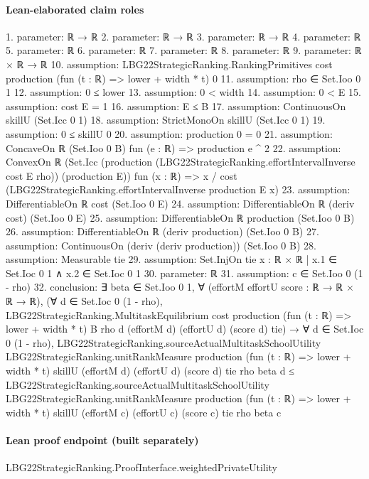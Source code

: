 \documentclass[10pt]{article}
\begin{document}
\paragraph{Lean-elaborated claim roles}\begin{ReviewVerbatim}
1. parameter: ℝ → ℝ
2. parameter: ℝ → ℝ
3. parameter: ℝ → ℝ
4. parameter: ℝ
5. parameter: ℝ
6. parameter: ℝ
7. parameter: ℝ
8. parameter: ℝ
9. parameter: ℝ × ℝ → ℝ
10. assumption: LBG22StrategicRanking.RankingPrimitives cost production (fun (t : ℝ) => lower + width * t) 0
11. assumption: rho ∈ Set.Ioo 0 1
12. assumption: 0 ≤ lower
13. assumption: 0 < width
14. assumption: 0 < E
15. assumption: cost E = 1
16. assumption: E ≤ B
17. assumption: ContinuousOn skillU (Set.Icc 0 1)
18. assumption: StrictMonoOn skillU (Set.Icc 0 1)
19. assumption: 0 ≤ skillU 0
20. assumption: production 0 = 0
21. assumption: ConcaveOn ℝ (Set.Ioo 0 B) fun (e : ℝ) => production e ^ 2
22. assumption: ConvexOn ℝ (Set.Icc (production (LBG22StrategicRanking.effortIntervalInverse cost E rho)) (production E)) fun (x : ℝ) =>
  x / cost (LBG22StrategicRanking.effortIntervalInverse production E x)
23. assumption: DifferentiableOn ℝ cost (Set.Ioo 0 E)
24. assumption: DifferentiableOn ℝ (deriv cost) (Set.Ioo 0 E)
25. assumption: DifferentiableOn ℝ production (Set.Ioo 0 B)
26. assumption: DifferentiableOn ℝ (deriv production) (Set.Ioo 0 B)
27. assumption: ContinuousOn (deriv (deriv production)) (Set.Ioo 0 B)
28. assumption: Measurable tie
29. assumption: Set.InjOn tie {x : ℝ × ℝ | x.1 ∈ Set.Ioc 0 1 ∧ x.2 ∈ Set.Ioc 0 1}
30. parameter: ℝ
31. assumption: c ∈ Set.Ioo 0 (1 - rho)
32. conclusion: ∃ beta ∈ Set.Ioo 0 1,
  ∀ (effortM effortU score : ℝ → ℝ × ℝ → ℝ),
    (∀ d ∈ Set.Ioc 0 (1 - rho),
        LBG22StrategicRanking.MultitaskEquilibrium cost production (fun (t : ℝ) => lower + width * t) B rho d
          (effortM d) (effortU d) (score d) tie) →
      ∀ d ∈ Set.Ioc 0 (1 - rho),
        LBG22StrategicRanking.sourceActualMultitaskSchoolUtility LBG22StrategicRanking.unitRankMeasure production
            (fun (t : ℝ) => lower + width * t) skillU (effortM d) (effortU d) (score d) tie rho beta d ≤
          LBG22StrategicRanking.sourceActualMultitaskSchoolUtility LBG22StrategicRanking.unitRankMeasure production
            (fun (t : ℝ) => lower + width * t) skillU (effortM c) (effortU c) (score c) tie rho beta c
\end{ReviewVerbatim}

\paragraph{Lean proof endpoint (built separately)}\begin{ReviewVerbatim}
LBG22StrategicRanking.ProofInterface.weightedPrivateUtility
\end{ReviewVerbatim}
\end{document}

